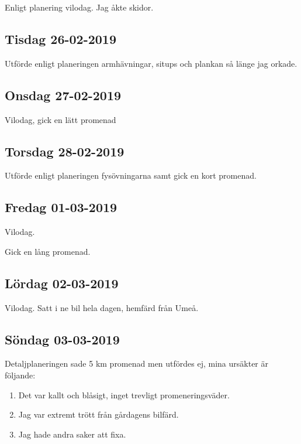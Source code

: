 \documentclass[a4paper, 12pt]{article}
\begin{document}
    Enligt planering vilodag. Jag åkte skidor.
    
\subsection{Tisdag 26-02-2019}

    Utförde enligt planeringen armhävningar, situps och plankan så länge jag orkade. 

\subsection{Onsdag 27-02-2019}

    Vilodag, gick en lätt promenad

\subsection{Torsdag 28-02-2019}

    Utförde enligt planeringen fysövningarna samt gick en kort promenad.

\subsection{Fredag 01-03-2019}

    Vilodag.
    
    Gick en lång promenad.

\subsection{Lördag 02-03-2019}

    Vilodag. Satt i ne bil hela dagen, hemfärd från Umeå. 

\subsection{Söndag 03-03-2019}

    Detaljplaneringen sade 5 km promenad men utfördes ej, mina ursäkter är följande: 

    \begin{enumerate}
        \item Det var kallt och blåsigt, inget trevligt promeneringsväder.
        \item Jag var extremt trött från gårdagens bilfärd.
        \item Jag hade andra saker att fixa.
        
    \end{enumerate}
\end{document}
